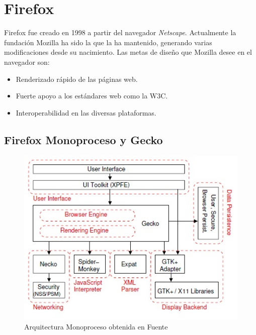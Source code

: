 \section{Firefox}
    \label{chap3:Firefox}

    Firefox fue creado en 1998 a partir del navegador \textit{Netscape}. Actualmente la fundación Mozilla ha sido la que la ha mantenido, generando varias modificaciones desde su nacimiento. Las metas de diseño que Mozilla desee en el navegador son:
    \begin{itemize}
        \item Renderizado rápido de las páginas web.
        \item Fuerte apoyo a los estándares web como la W3C.
        \item Interoperabilidad en las diversas plataformas.
    \end{itemize}

    \subsection{Firefox Monoproceso y Gecko}
        \begin{figure}[h!t]
    		\centering
        	\includegraphics[scale=0.85]{figures/archMoz.jpg}
            \caption{Arquitectura Monoproceso obtenida en Fuente \cite{2005-grosskurth-browser-refarch, preprint-grosskurth-browser-archevol}}
            \label{fig:archM}
        \end{figure}
                
